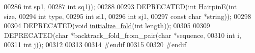 \begin{DoxyCode}
00286                           \textcolor{keywordtype}{int} sp1,
00287                           \textcolor{keywordtype}{int} sq1));
00288 
00293 DEPRECATED(\textcolor{keywordtype}{int} \hyperlink{group__mfe__fold__single_gab327ce11972f5ac069d52c8dedfdb700}{HairpinE}(\textcolor{keywordtype}{int} size,
00294                         \textcolor{keywordtype}{int} type,
00295                         \textcolor{keywordtype}{int} si1,
00296                         \textcolor{keywordtype}{int} sj1,
00297                         \textcolor{keyword}{const} \textcolor{keywordtype}{char} *\textcolor{keywordtype}{string}));
00298 
00304 DEPRECATED(\textcolor{keywordtype}{void} \hyperlink{group__mfe__fold__single_gac3f0a28d9cb609d388b155445073fd20}{initialize\_fold}(\textcolor{keywordtype}{int} length));
00305 
00309 DEPRECATED(\textcolor{keywordtype}{char} *backtrack\_fold\_from\_pair(\textcolor{keywordtype}{char} *sequence,
00310                                           \textcolor{keywordtype}{int} i,
00311                                           \textcolor{keywordtype}{int} j));
00312 
00313 
00314 \textcolor{preprocessor}{#endif}
00315 
00320 \textcolor{preprocessor}{#endif}
\end{DoxyCode}
